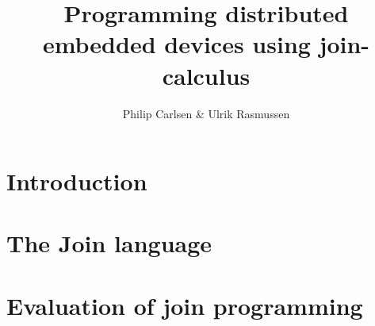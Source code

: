 \documentclass[a4paper, oneside, draft]{memoir}
\title{Programming distributed embedded devices using join-calculus}
\author{Philip Carlsen \& Ulrik Rasmussen}
\begin{document}

\lstset{language=join,
        basicstyle=\small
}

\frontmatter

\maketitle
\iffalse
\begin{abstract}

\end{abstract}

\clearpage
\chapter*{Preface}


\clearpage

\tableofcontents*

\fi
\mainmatter

\chapter{Introduction}


\chapter{The Join language}


\chapter{Evaluation of join programming}





\end{document}
